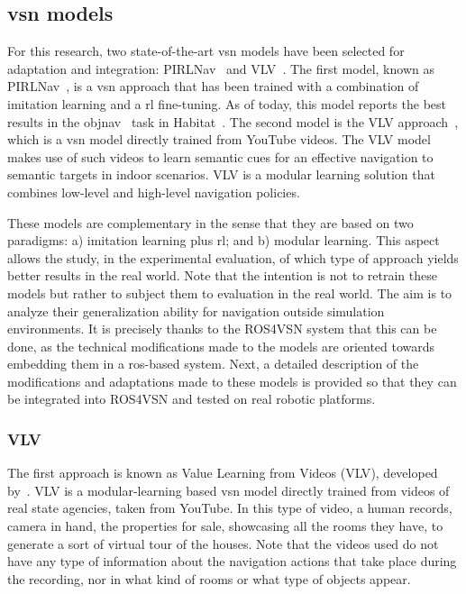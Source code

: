 
\subsection{\acrshort{vsn} models}\label{subsec:vsn_models}
For this research, two state-of-the-art \acrshort{vsn} models have been selected for adaptation and integration: PIRLNav~\cite{ramrakhya2023} and VLV~\cite{chang2020}.
The first model, known as PIRLNav~\cite{ramrakhya2023}, is a \acrshort{vsn} approach that has been trained with a combination of imitation learning and a \acrshort{rl} fine-tuning.
As of today, this model reports the best results in the \acrshort{objnav}~\cite{batra2020} task in Habitat~\cite{NEURIPS2021_021bbc7e}.
The second model is the VLV approach~\cite{chang2020}, which is a \acrshort{vsn} model directly trained from YouTube videos.
The VLV model makes use of such videos to learn semantic cues for an effective navigation to semantic targets in indoor scenarios.
VLV is a modular learning solution that combines low-level and high-level navigation policies.

These models are complementary in the sense that they are based on two paradigms: a) imitation learning plus \acrshort{rl}; and b) modular learning.
This aspect allows the study, in the experimental evaluation, of which type of approach yields better results in the real world.
Note that the intention is not to retrain these models but rather to subject them to evaluation in the real world.
The aim is to analyze their generalization ability for navigation outside simulation environments.
It is precisely thanks to the ROS4VSN system that this can be done, as the technical modifications made to the models are oriented towards embedding them in a \acrshort{ros}-based system.
Next, a detailed description of the modifications and adaptations made to these models is provided so that they can be integrated into ROS4VSN and tested on real robotic platforms.

\subsubsection{VLV}

The first approach is known as Value Learning from Videos (\textsc{VLV}), developed by~\cite{chang2020}.
VLV is a modular-learning based \acrshort{vsn} model directly trained from videos of real state agencies, taken from YouTube.
In this type of video, a human records, camera in hand, the properties for sale, showcasing all the rooms they have, to generate a sort of virtual tour of the houses.
Note that the videos used do not have any type of information about the navigation actions that take place during the recording, nor in what kind of rooms or what type of objects appear.

